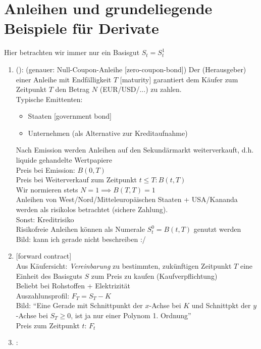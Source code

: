 \section{Anleihen und grundeliegende Beispiele für Derivate}
Hier betrachten wir immer nur ein Basisgut $S_t = S^1_t$
\begin{enumerate}
	\item {}(): (genauer: Null-Coupon-Anleihe [zero-coupon-bond]) Der  (Herausgeber) einer Anleihe mit Endfälligkeit $T$ [maturity] garantiert dem Käufer zum Zeitpunkt $T$ den Betrag $N$ (EUR/USD/...) zu zahlen.\\
	Typische Emittenten:
	\begin{itemize}
		\item Staaten [government bond]
		\item Unternehmen (als Alternative zur Kreditaufnahme)
	\end{itemize}
	Nach Emission werden Anleihen auf den Sekundärmarkt weiterverkauft, d.h. liquide gehandelte Wertpapiere\\
	Preis bei Emission: $B(0,T)$\\
	Preis bei Weiterverkauf zum Zeitpunkt $t \le T\colon B(t,T)$\\
	Wir normieren stets $N=1 \implies B(T,T) =1$\\
	Anleihen von West/Nord/Mitteleuropäischen Staaten + USA/Kananda werden als risikolos betrachtet (sichere Zahlung).\\
	Sonst: Kreditrisiko\\
	Risikofreie Anleihen können als Numerale $S^0_t = B(t,T)$ genutzt werden\\
	Bild: kann ich gerade nicht beschreiben :/ \\
	\item {} [forward contract]\\
	Aus Käufersicht: \emph{Vereinbarung} zu bestimmten, zukünftigen Zeitpunkt $T$ eine Einheit des Basisguts $S$ zum Preis zu kaufen (Kaufverpflichtung)\\
	Beliebt bei Rohstoffen + Elektrizität\\
	Auszahlunsprofil: $F_T = S_T - K$\\
	Bild: ``Eine Gerade mit Schnittpunkt der $x$-Achse bei $K$ und Schnittpkt der $y$-Achse bei $S_T \ge 0$, ist ja nur einer Polynom 1. Ordnung''\\
	Preis zum Zeitpunkt $t$: $F_t$
	\item {}:

\end{enumerate}
